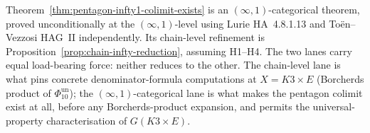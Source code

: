 \begin{remark}
\label{rem:pentagon-dual-lane-status}
Theorem~\ref{thm:pentagon-infty1-colimit-exists} is an $(\infty,1)$-categorical theorem,
proved unconditionally at the $(\infty,1)$-level using Lurie HA~4.8.1.13 and
To\"en--Vezzosi HAG~II independently. Its chain-level refinement is
Proposition~\ref{prop:chain-infty-reduction}, assuming H1--H4. The two lanes carry
equal load-bearing force: neither reduces to the other. The chain-level lane is what pins
concrete denominator-formula computations at $X = K3 \times E$ (Borcherds product of
$\Phi_{10}^{\mathrm{un}}$); the $(\infty,1)$-categorical lane is what makes the pentagon colimit exist at
all, before any Borcherds-product expansion, and permits the universal-property
characterisation of $G(K3 \times E)$.
\end{remark}
